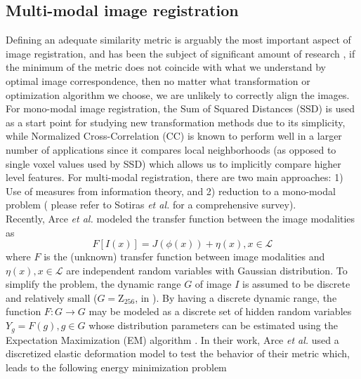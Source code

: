 \subsection{Multi-modal image registration}

Defining an adequate similarity metric is arguably the most important aspect of image registration, and has been the subject of significant amount of research \cite{Sotiras2013}, if
the minimum of the metric does not coincide with what we understand by optimal image correspondence, then no matter what transformation or optimization algorithm we choose, we are
unlikely to correctly align the images. For mono-modal image registration, the Sum of Squared Distances (SSD) is used as a start point for studying new transformation methods due to
its simplicity, while Normalized Cross-Correlation (CC) is known to perform well in a larger number of applications since it compares local neighborhoods (as opposed to single
voxel values used by SSD) which allows us to implicitly compare higher level features. For multi-modal registration, there are two main approaches: 1) Use of measures from information theory, and 2) reduction to a mono-modal problem ( please refer to Sotiras {\it et al.} \cite{Sotiras2013} for a comprehensive survey).\\

Recently, Arce {\it et al.} \cite{Arce-santana2014} modeled the transfer function between the image modalities as
\begin{equation}\label{eq:arce_model}
    F[I(x)] = J(\phi(x)) + \eta(x), x\in \mathcal{L}
\end{equation}
where $F$ is the (unknown) transfer function between image modalities and $\eta(x), x\in \mathcal{L}$ are independent random variables with Gaussian distribution. To simplify
the problem, the dynamic range $G$ of image $I$ is assumed to be discrete and relatively small ($G = \mathrm{Z}_{256}$, in \cite{Arce-santana2014}). By having a discrete
dynamic range, the function $F: G \rightarrow G$ may be modeled as a discrete set of hidden random variables $Y_g = F(g), g\in G$ whose distribution parameters
can be estimated using the Expectation Maximization (EM) algorithm \cite{Dempster1977}. In their work, Arce {\it et al.} \cite{Arce-santana2014} used a discretized elastic
deformation model to test the behavior of their metric which, leads to the following energy minimization problem

